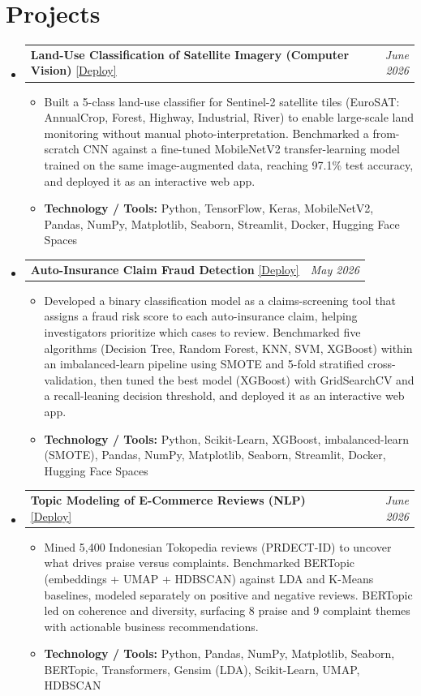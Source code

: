 \documentclass[letterpaper,10pt]{article}
\makeatletter
\newcommand{\resumeItem}[1]{\item\small{#1}}
\newcommand{\resumeProjectHeading}[3]{
\vspace{2pt}\item
  \begin{tabular*}{0.97\textwidth}[t]{l@{\extracolsep{\fill}}r}
    \textbf{#1} \enspace \href{#2}{\underline{[Deploy]}} & \textit{#3} \\
  \end{tabular*}\vspace{-7pt}
}
\newcommand{\resumeSubHeadingList}{\begin{itemize}[leftmargin=0.15in, label={}]}
\newcommand{\resumeSubHeadingListEnd}{\end{itemize}}
\makeatother
\begin{document}
\section{Projects}
\resumeSubHeadingList
  \resumeProjectHeading
      {Land-Use Classification of Satellite Imagery (Computer Vision)}{https://huggingface.co/spaces/dahutapea/Classification-of-Satellite-Imagery}{June 2026}
      \resumeSubHeadingList
          \resumeItem{Built a 5-class land-use classifier for Sentinel-2 satellite tiles (EuroSAT: AnnualCrop, Forest, Highway, Industrial, River) to enable large-scale land monitoring without manual photo-interpretation. Benchmarked a from-scratch CNN against a fine-tuned MobileNetV2 transfer-learning model trained on the same image-augmented data, reaching 97.1\% test accuracy, and deployed it as an interactive web app.}
          \resumeItem{\textbf{Technology / Tools:} Python, TensorFlow, Keras, MobileNetV2, Pandas, NumPy, Matplotlib, Seaborn, Streamlit, Docker, Hugging Face Spaces}
      \resumeSubHeadingListEnd
  \resumeProjectHeading
      {Auto-Insurance Claim Fraud Detection}{https://huggingface.co/spaces/dahutapea/insurance-fraud-detection}{May 2026}
      \resumeSubHeadingList
          \resumeItem{Developed a binary classification model as a claims-screening tool that assigns a fraud risk score to each auto-insurance claim, helping investigators prioritize which cases to review. Benchmarked five algorithms (Decision Tree, Random Forest, KNN, SVM, XGBoost) within an imbalanced-learn pipeline using SMOTE and 5-fold stratified cross-validation, then tuned the best model (XGBoost) with GridSearchCV and a recall-leaning decision threshold, and deployed it as an interactive web app.}
          \resumeItem{\textbf{Technology / Tools:} Python, Scikit-Learn, XGBoost, imbalanced-learn (SMOTE), Pandas, NumPy, Matplotlib, Seaborn, Streamlit, Docker, Hugging Face Spaces}
      \resumeSubHeadingListEnd
  \resumeProjectHeading
      {Topic Modeling of E-Commerce Reviews (NLP)}{https://huggingface.co/spaces/dahutapea}{June 2026}
      \resumeSubHeadingList
          \resumeItem{Mined 5,400 Indonesian Tokopedia reviews (PRDECT-ID) to uncover what drives praise versus complaints. Benchmarked BERTopic (embeddings + UMAP + HDBSCAN) against LDA and K-Means baselines, modeled separately on positive and negative reviews. BERTopic led on coherence and diversity, surfacing 8 praise and 9 complaint themes with actionable business recommendations.}
          \resumeItem{\textbf{Technology / Tools:} Python, Pandas, NumPy, Matplotlib, Seaborn, BERTopic, Transformers, Gensim (LDA), Scikit-Learn, UMAP, HDBSCAN}
      \resumeSubHeadingListEnd
\resumeSubHeadingListEnd
\end{document}
